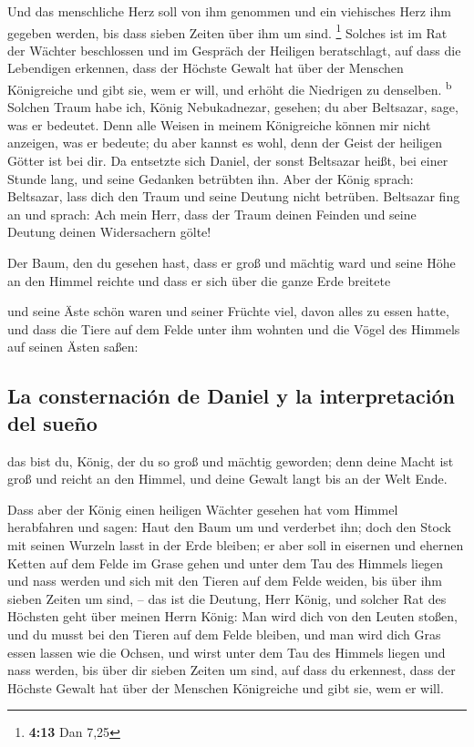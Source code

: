  Und das menschliche Herz soll von ihm genommen und ein
viehisches Herz ihm gegeben werden, bis dass sieben Zeiten über ihm um
sind. \footnote{\textbf{4:13} Dan 7,25}  Solches ist im
Rat der Wächter beschlossen und im Gespräch der Heiligen beratschlagt,
auf dass die Lebendigen erkennen, dass der Höchste Gewalt hat über der
Menschen Königreiche und gibt sie, wem er will, und erhöht die Niedrigen
zu denselben. \textsuperscript{b}  Solchen Traum habe
ich, König Nebukadnezar, gesehen; du aber Beltsazar, sage, was er
bedeutet. Denn alle Weisen in meinem Königreiche können mir nicht
anzeigen, was er bedeute; du aber kannst es wohl, denn der Geist der
heiligen Götter ist bei dir.  Da entsetzte sich Daniel,
der sonst Beltsazar heißt, bei einer Stunde lang, und seine Gedanken
betrübten ihn. Aber der König sprach: Beltsazar, lass dich den Traum und
seine Deutung nicht betrüben. Beltsazar fing an und sprach: Ach mein
Herr, dass der Traum deinen Feinden und seine Deutung deinen
Widersachern gölte!

 Der Baum, den du gesehen hast, dass er groß und mächtig
ward und seine Höhe an den Himmel reichte und dass er sich über die
ganze Erde breitete

 und seine Äste schön waren und seiner Früchte viel,
davon alles zu essen hatte, und dass die Tiere auf dem Felde unter ihm
wohnten und die Vögel des Himmels auf seinen Ästen saßen:

\hypertarget{la-consternaciuxf3n-de-daniel-y-la-interpretaciuxf3n-del-sueuxf1o}{%
\subsection{La consternación de Daniel y la interpretación del
sueño}\label{la-consternaciuxf3n-de-daniel-y-la-interpretaciuxf3n-del-sueuxf1o}}

 das bist du, König, der du so groß und mächtig geworden;
denn deine Macht ist groß und reicht an den Himmel, und deine Gewalt
langt bis an der Welt Ende.

 Dass aber der König einen heiligen Wächter gesehen hat
vom Himmel herabfahren und sagen: Haut den Baum um und verderbet ihn;
doch den Stock mit seinen Wurzeln lasst in der Erde bleiben; er aber
soll in eisernen und ehernen Ketten auf dem Felde im Grase gehen und
unter dem Tau des Himmels liegen und nass werden und sich mit den Tieren
auf dem Felde weiden, bis über ihm sieben Zeiten um sind, --
 das ist die Deutung, Herr König, und solcher Rat des
Höchsten geht über meinen Herrn König:  Man wird dich von
den Leuten stoßen, und du musst bei den Tieren auf dem Felde bleiben,
und man wird dich Gras essen lassen wie die Ochsen, und wirst unter dem
Tau des Himmels liegen und nass werden, bis über dir sieben Zeiten um
sind, auf dass du erkennest, dass der Höchste Gewalt hat über der
Menschen Königreiche und gibt sie, wem er will.

